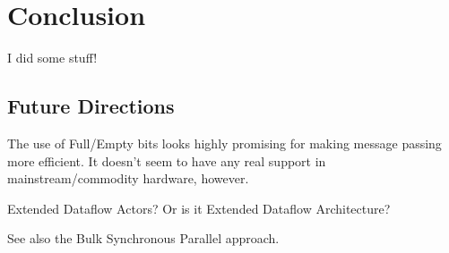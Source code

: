 \chapter{Conclusion}

I did some stuff!

\section{Future Directions}
The use of Full/Empty bits looks highly promising for making message passing more efficient.  It doesn't seem to have any real support in mainstream/commodity hardware, however.

Extended Dataflow Actors?  Or is it Extended Dataflow Architecture?

See also the Bulk Synchronous Parallel approach.